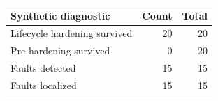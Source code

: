 \begin{tabular}{lrr}
\toprule
Synthetic diagnostic & Count & Total \\
\midrule
Lifecycle hardening survived & 20 & 20 \\
Pre-hardening survived & 0 & 20 \\
Faults detected & 15 & 15 \\
Faults localized & 15 & 15 \\
\bottomrule
\end{tabular}
